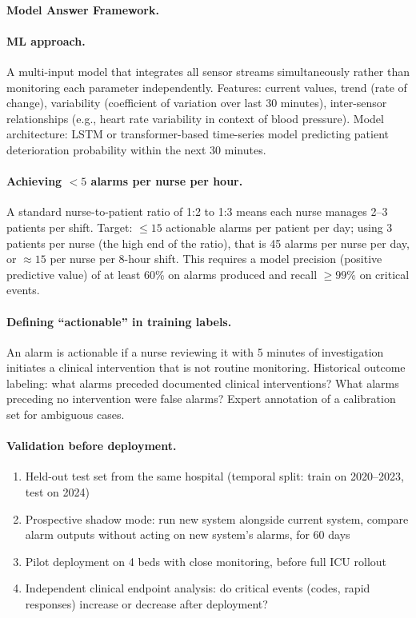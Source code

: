 \paragraph{Model Answer Framework.}

\paragraph{ML approach.}

A multi-input model that integrates all sensor streams simultaneously rather than monitoring each parameter independently. Features: current values, trend (rate of change), variability (coefficient of variation over last 30 minutes), inter-sensor relationships (e.g., heart rate variability in context of blood pressure). Model architecture: LSTM or transformer-based time-series model predicting patient deterioration probability within the next 30 minutes.

\paragraph{Achieving $< 5$ alarms per nurse per hour.}

A standard nurse-to-patient ratio of 1:2 to 1:3 means each nurse manages 2--3 patients per shift. Target: $\leq 15$ actionable alarms per patient per day; using 3 patients per nurse (the high end of the ratio), that is 45 alarms per nurse per day, or $\approx 15$ per nurse per 8-hour shift. This requires a model precision (positive predictive value) of at least 60\% on alarms produced and recall $\geq 99\%$ on critical events.

\paragraph{Defining ``actionable'' in training labels.}

An alarm is actionable if a nurse reviewing it with 5 minutes of investigation initiates a clinical intervention that is not routine monitoring. Historical outcome labeling: what alarms preceded documented clinical interventions? What alarms preceding no intervention were false alarms? Expert annotation of a calibration set for ambiguous cases.

\paragraph{Validation before deployment.}

\begin{enumerate}
    \item Held-out test set from the same hospital (temporal split: train on 2020--2023, test on 2024)
    \item Prospective shadow mode: run new system alongside current system, compare alarm outputs without acting on new system's alarms, for 60 days
    \item Pilot deployment on 4 beds with close monitoring, before full ICU rollout
    \item Independent clinical endpoint analysis: do critical events (codes, rapid responses) increase or decrease after deployment?
\end{enumerate}

